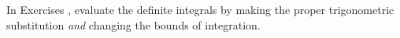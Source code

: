 {\noindent In Exercises}
{,  evaluate the definite integrals by making the proper trigonometric substitution \emph{and} changing the bounds of integration.%
}
